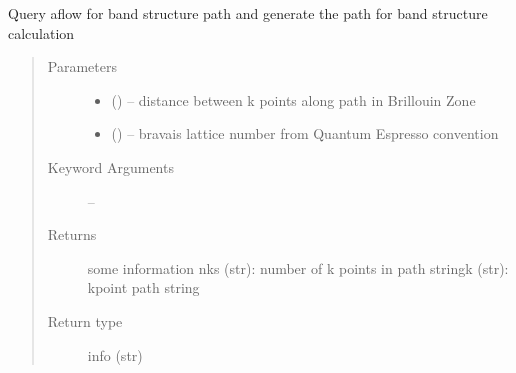 \documentclass[letterpaper,10pt,english]{sphinxmanual}
\begin{document}
\begin{fulllineitems}
\label{\detokenize{prep:prep.bandsAflow}}
Query aflow for band structure path and generate the path for band structure calculation
\begin{quote}\begin{description}
\item[{Parameters}] \leavevmode\begin{itemize}
\item {} 
 () -- distance between k points along path in Brillouin Zone

\item {} 
 () -- bravais lattice number from Quantum Espresso convention

\end{itemize}

\item[{Keyword Arguments}] \leavevmode
{} -- 

\item[{Returns}] \leavevmode
some information
nks (str): number of k points in path
stringk (str): kpoint path string

\item[{Return type}] \leavevmode
info (str)

\end{description}\end{quote}

\end{fulllineitems}


\begin{fulllineitems}
\label{\detokenize{prep:prep.build_calcs}}
\end{fulllineitems}

\end{document}
